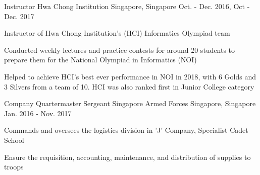 \begin{cventries}
  \cventry
    {Instructor} %
    {Hwa Chong Institution} %
    {Singapore, Singapore} %
    {Oct. - Dec. 2016, Oct - Dec. 2017} %
    {
      \begin{cvitems} %
      \item { Instructor of Hwa Chong Institution’s (HCI) Informatics Olympiad team}
      \item { Conducted weekly lectures and practice contests for around 20 students to prepare them for the National Olympiad in Informatics (NOI)}
      \item { Helped to achieve HCI's best ever performance in NOI in 2018, with 6 Golds and 3 Silvers from a team of 10. HCI was also ranked first in Junior College category}
      \end{cvitems}
    }

  \cventry
    {Company Quartermaster Sergeant} %
    {Singapore Armed Forces} %
    {Singapore, Singapore} %
    {Jan. 2016 - Nov. 2017} %
    {
      \begin{cvitems} %
      \item {Commands and oversees the logistics division in ’J’ Company, Specialist Cadet School}
      \item {Ensure the requisition, accounting, maintenance, and distribution of supplies to troops}
      \end{cvitems}
    }

\end{cventries}
